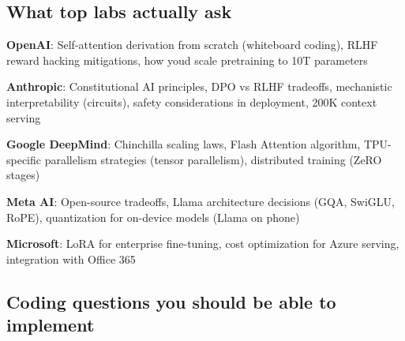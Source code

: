 \documentclass[11pt]{article}
\begin{document}
\subsection{What top labs actually ask}\label{what-top-labs-actually-ask}

\textbf{OpenAI}: Self-attention derivation from scratch (whiteboard coding), RLHF reward hacking mitigations, how you\textquotesingle d scale pretraining to 10T parameters

\textbf{Anthropic}: Constitutional AI principles, DPO vs RLHF tradeoffs, mechanistic interpretability (circuits), safety considerations in deployment, 200K context serving

\textbf{Google DeepMind}: Chinchilla scaling laws, Flash Attention algorithm, TPU-specific parallelism strategies (tensor parallelism), distributed training (ZeRO stages)

\textbf{Meta AI}: Open-source tradeoffs, Llama architecture decisions (GQA, SwiGLU, RoPE), quantization for on-device models (Llama on phone)

\textbf{Microsoft}: LoRA for enterprise fine-tuning, cost optimization for Azure serving, integration with Office 365

\subsection{Coding questions you should be able to implement}\label{coding-questions-you-should-be-able-to-implement}

\end{document}
